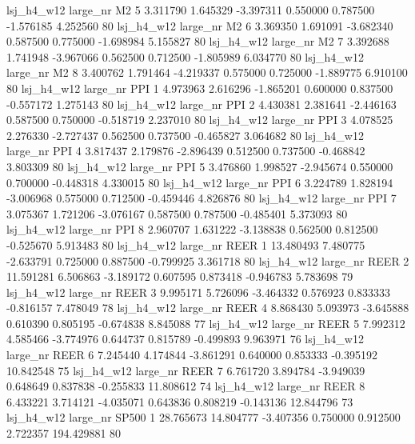   lsj_h4_w12   large_nr       M2                 5  3.311790  1.645329  -3.397311 0.550000 0.787500 -1.576185    4.252560 80
  lsj_h4_w12   large_nr       M2                 6  3.369350  1.691091  -3.682340 0.587500 0.775000 -1.698984    5.155827 80
  lsj_h4_w12   large_nr       M2                 7  3.392688  1.741948  -3.967066 0.562500 0.712500 -1.805989    6.034770 80
  lsj_h4_w12   large_nr       M2                 8  3.400762  1.791464  -4.219337 0.575000 0.725000 -1.889775    6.910100 80
  lsj_h4_w12   large_nr      PPI                 1  4.973963  2.616296  -1.865201 0.600000 0.837500 -0.557172    1.275143 80
  lsj_h4_w12   large_nr      PPI                 2  4.430381  2.381641  -2.446163 0.587500 0.750000 -0.518719    2.237010 80
  lsj_h4_w12   large_nr      PPI                 3  4.078525  2.276330  -2.727437 0.562500 0.737500 -0.465827    3.064682 80
  lsj_h4_w12   large_nr      PPI                 4  3.817437  2.179876  -2.896439 0.512500 0.737500 -0.468842    3.803309 80
  lsj_h4_w12   large_nr      PPI                 5  3.476860  1.998527  -2.945674 0.550000 0.700000 -0.448318    4.330015 80
  lsj_h4_w12   large_nr      PPI                 6  3.224789  1.828194  -3.006968 0.575000 0.712500 -0.459446    4.826876 80
  lsj_h4_w12   large_nr      PPI                 7  3.075367  1.721206  -3.076167 0.587500 0.787500 -0.485401    5.373093 80
  lsj_h4_w12   large_nr      PPI                 8  2.960707  1.631222  -3.138838 0.562500 0.812500 -0.525670    5.913483 80
  lsj_h4_w12   large_nr     REER                 1 13.480493  7.480775  -2.633791 0.725000 0.887500 -0.799925    3.361718 80
  lsj_h4_w12   large_nr     REER                 2 11.591281  6.506863  -3.189172 0.607595 0.873418 -0.946783    5.783698 79
  lsj_h4_w12   large_nr     REER                 3  9.995171  5.726096  -3.464332 0.576923 0.833333 -0.816157    7.478049 78
  lsj_h4_w12   large_nr     REER                 4  8.868430  5.093973  -3.645888 0.610390 0.805195 -0.674838    8.845088 77
  lsj_h4_w12   large_nr     REER                 5  7.992312  4.585466  -3.774976 0.644737 0.815789 -0.499893    9.963971 76
  lsj_h4_w12   large_nr     REER                 6  7.245440  4.174844  -3.861291 0.640000 0.853333 -0.395192   10.842548 75
  lsj_h4_w12   large_nr     REER                 7  6.761720  3.894784  -3.949039 0.648649 0.837838 -0.255833   11.808612 74
  lsj_h4_w12   large_nr     REER                 8  6.433221  3.714121  -4.035071 0.643836 0.808219 -0.143136   12.844796 73
  lsj_h4_w12   large_nr    SP500                 1 28.765673 14.804777  -3.407356 0.750000 0.912500  2.722357  194.429881 80

